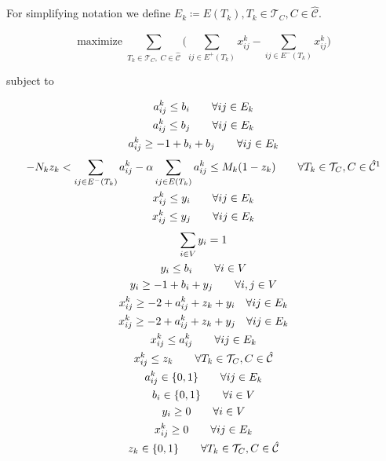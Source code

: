 For simplifying notation we define $E_{k} \coloneqq E(T_{k}), T_{k} \in
	\mathcal{T}_{C}, C \in \mathcal{\hat{C}}$.

\begin{equation}
	\label{eq:d-ecp-objective}
	\text{maximize} \; \sum_{ T_{k} \in \mathcal{T}_{C}, \; C \in
		\mathcal{\hat{C}} } \big( \sum^{}_{ij \in E^{+} (T_{k})} x_{ij}
		^{k} - \sum_{ij \in E^{-} (T_{k})} x_{ij} ^{k} \big)
\end{equation} \begin{center} subject to \end{center}
\begin{gather}
	\label{eq:d-ecp-a-ij-l-bi}
	a_{ij}^{k} \leq b_{i} \quad\quad \forall ij \in E_k \\
	\label{eq:d-ecp-a-ij-l-bj}
	a_{ij}^{k} \leq b_{j} \quad\quad \forall ij \in E_k \\
	\label{eq:d-ecp-a-ij-g-ijk}
	a _{ij} ^{k} \geq - 1 + b_i + b_j \quad\quad \forall ij \in E_k \\
	\label{eq:d-ecp-alpha-constraint}
	-N_{k} z_k < \sum^{}_{ij \in E^{-} (T_k)} a_{ij}^{k}  - \alpha \sum^{}_{ij \in E(T_k)}
	a_{ij} ^{k}  \leq M_k (1 - z_k) \quad\quad \forall T_{k} \in \mathcal{T} _{C}, C \in
	\hat{\mathcal{C}}\footnotemark \\
	\label{eq:d-ecp-edge-charikar1}
	x _{ij}^{k}  \leq y_i \quad\quad \forall ij \in E_{k} \\
	\label{eq:d-ecp-edge-charikar2}
	x _{ij} ^{k} \leq y_j \quad\quad \forall ij \in E_k \\
	\label{eq:d-ecp-vertex-charikar1}
	\sum^{}_{i \in V} y_i = 1 \\
	\label{eq:d-ecp-vertex-l-b}
	y_i \leq b_i \quad\quad \forall i \in V \\
	\label{eq:d-ecp-vertex-g-bi-yj}
	y_i \geq -1 + b_i + y_j \quad\quad \forall i,j \in V \\
	\label{eq:d-ecp-x-l-sum1}
	x_{ij}^{k} \geq -2 + a_{ij} ^{k} + z_k + y_i \quad \forall ij \in E_k \\
	\label{eq:d-ecp-x-l-sum2}
	x_{ij}^{k} \geq -2 + a_{ij} ^{k} + z_k + y_j \quad \forall ij \in E_k \\
	\label{eq:d-ecp-x-l-a}
	x_{ij} ^{k} \leq a_{ij} ^{k} \quad\quad \forall ij \in E_k \\
	\label{eq:d-ecp-x-l-z}
	x_{ij} ^{k} \leq z_k \quad\quad \forall T_{k} \in \mathcal{T} _{C}, C \in
	\hat{\mathcal{C}}  \\
	\label{eq:d-ecp-a-ij}
	a _{ij} ^{k}  \in \{0, 1\} \quad\quad \forall ij \in E_k\\
	\label{eq:d-ecp-b-i}
	b _{i} \in \{0, 1\} \quad\quad \forall i \in V \\
	\label{eq:d-ecp-y-i}
	y _{i} \geq 0 \quad\quad \forall i \in V \\
	\label{eq:d-ecp-x-ij}
	x _{ij} ^{k}  \geq 0 \quad\quad \forall ij \in E_k\\
	\label{eq:d-ecp-z-k}
	z _{k} \in \{0, 1\} \quad\quad \forall T_{k} \in \mathcal{T} _{C}, C \in
	\hat{\mathcal{C}}
\end{gather}


